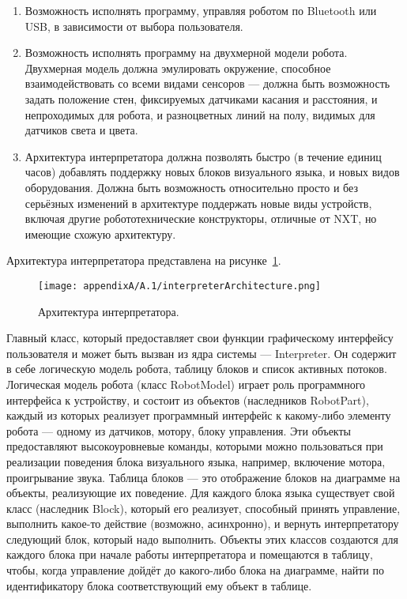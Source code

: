 \begin{enumerate}
	\item Возможность исполнять программу, управляя роботом по Bluetooth или USB, в 
		зависимости от выбора пользователя.
	\item Возможность исполнять программу на двухмерной модели робота. Двухмерная модель 
		должна эмулировать окружение, способное взаимодействовать со всеми видами сенсоров 
		--- должна быть возможность задать положение стен, фиксируемых датчиками касания 
		и расстояния, и непроходимых для робота, и разноцветных линий на полу, видимых 
		для датчиков света и цвета.
	\item Архитектура интерпретатора должна позволять быстро (в течение единиц часов) 
		добавлять поддержку новых блоков визуального языка, и новых видов оборудования. 
		Должна быть возможность относительно просто и без серьёзных изменений в архитектуре 
		поддержать новые виды устройств, включая другие робототехнические конструкторы, 
		отличные от NXT, но имеющие схожую архитектуру.
\end{enumerate}

Архитектура интерпретатора представлена на рисунке~\ref{image:interpreterArchitecture}.

\begin{figure} [ht]
	\begin{center}
		\texttt{[image: appendixA/A.1/interpreterArchitecture.png]}
		\caption{Архитектура интерпретатора.}
		\label{image:interpreterArchitecture}
	\end{center}
\end{figure}

Главный класс, который предоставляет свои функции графическому интерфейсу пользователя 
и может быть вызван из ядра системы --- Interpreter. Он содержит в себе логическую 
модель робота, таблицу блоков и список активных потоков. Логическая модель робота 
(класс RobotModel) играет роль программного интерфейса к устройству, и состоит из 
объектов (наследников RobotPart), каждый из которых реализует программный интерфейс 
к какому-либо элементу робота --- одному из датчиков, мотору, блоку управления. Эти 
объекты предоставляют высокоуровневые команды, которыми можно пользоваться при реализации 
поведения блока визуального языка, например, включение мотора, проигрывание звука. 
Таблица блоков --- это отображение блоков на диаграмме на объекты, реализующие их 
поведение. Для каждого блока языка существует свой класс (наследник Block), который 
его реализует, способный принять управление, выполнить какое-то действие (возможно, 
асинхронно), и вернуть интерпретатору следующий блок, который надо выполнить. Объекты 
этих классов создаются для каждого блока при начале работы интерпретатора и помещаются 
в таблицу, чтобы, когда управление дойдёт до какого-либо блока на диаграмме, найти 
по идентификатору блока соответствующий ему объект в таблице.

